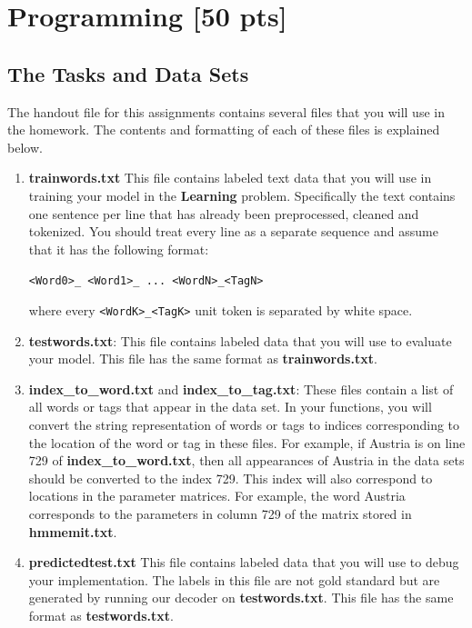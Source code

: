 \documentclass{article}
\begin{document}
\clearpage


\section{Programming [50 pts]}
\label{programming}

\subsection{The Tasks and Data Sets}\label{dataset}
The handout file for this assignments contains several files that you will use in the homework. The contents and formatting of each of these files is explained below.
\begin{enumerate}

\item \textbf{trainwords.txt} This file contains labeled text data that you will use in training your model in the \textbf{Learning} problem. Specifically the text contains one sentence per line that has already been preprocessed, cleaned and tokenized. You should treat every line as a separate sequence and assume that it has the following format:

    \texttt{<Word0>\_<Tag0> <Word1>\_<Tag1> ... <WordN>\_<TagN>}

where every \texttt{<WordK>\_<TagK>} unit token is separated by white space.

\item \textbf{testwords.txt}: This file contains labeled data that you will use to evaluate your model. This file has the same format as \textbf{trainwords.txt}.
    
\item \textbf{index\_to\_word.txt} and \textbf{index\_to\_tag.txt}: These files contain a list of all words or tags that appear in the data set. In your functions, you will convert the string representation of words or tags to indices corresponding to the location of the word or tag in these files. For example, if Austria is on line 729 of \textbf{index\_to\_word.txt}, then all appearances of Austria in the data sets should be converted to the index 729. This index will also correspond to locations in the parameter matrices. For example, the word Austria corresponds to the parameters in column 729 of the matrix stored in \textbf{hmmemit.txt}.

\item \textbf{predictedtest.txt} This file contains labeled data that you will use to debug your implementation. The labels in this file are not gold standard but are generated by running our decoder on \textbf{testwords.txt}. This file has the same format as \textbf{testwords.txt}.


\end{enumerate}
\end{document}
